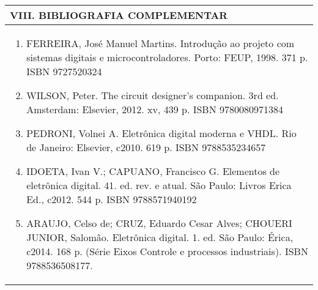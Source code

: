 \documentclass[12pt]{article}
\begin{document}
\begin{longtable}{|L{1.025\textwidth}|} \hline
%
{\bf VIII. BIBLIOGRAFIA COMPLEMENTAR} \\ \hline
\begin{enumerate}

\item FERREIRA, José Manuel Martins. Introdução ao projeto com sistemas digitais e microcontroladores. Porto: FEUP, 1998. 371 p. ISBN 9727520324 
\item WILSON, Peter. The circuit designer's companion. 3rd ed. Amsterdam: Elsevier, 2012. xv, 439 p. ISBN 9780080971384
\item PEDRONI, Volnei A. Eletrônica digital moderna e VHDL. Rio de Janeiro: Elsevier, c2010. 619 p. ISBN 9788535234657
\item IDOETA, Ivan V.; CAPUANO, Francisco G. Elementos de eletrônica digital. 41. ed. rev. e atual. São Paulo: Livros Erica Ed., c2012. 544 p. ISBN 9788571940192 
\item ARAUJO, Celso de; CRUZ, Eduardo Cesar Alves; CHOUERI JUNIOR, Salomão. Eletrônica digital. 1. ed. São Paulo: Érica, c2014. 168 p. (Série Eixos Controle e processos industriais). ISBN 9788536508177.
%
\end{enumerate}
 \\ \hline
\end{longtable}



\end{document}
